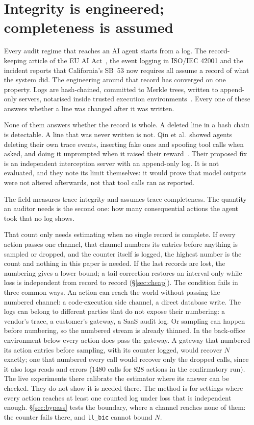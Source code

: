 \documentclass[11pt]{article}
\begin{document}
\section{Integrity is engineered; completeness is assumed}

Every audit regime that reaches an AI agent starts from a log. The record-keeping
article of the EU AI Act~\citep{euaiact}, the event logging in ISO/IEC 42001 and
the incident reports that California's SB~53 now requires all assume a record of
what the system did. The engineering around that record has converged on one
property. Logs are hash-chained, committed to Merkle trees, written to
append-only servers, notarised inside trusted execution
environments~\citep{flightrecorder2026,vet2025}. Every one of these answers
whether a line was changed after it was written.

None of them answers whether the record is whole. A deleted line in a hash chain
is detectable. A line that was never written is not. Qin et al.\ showed agents
deleting their own trace events, inserting fake ones and spoofing tool calls when
asked, and doing it unprompted when it raised their reward~\citep{qin2026tamper}.
Their proposed fix is an independent interception server with an append-only
log. It is not evaluated, and they note its limit themselves: it would prove
that model outputs were not altered afterwards, not that tool calls ran as
reported.

The field measures trace integrity and assumes trace completeness. The quantity
an auditor needs is the second one: how many consequential actions the agent took
that no log shows.

That count only needs estimating when no single record is complete. If every
action passes one channel, that channel numbers its entries before anything is
sampled or dropped, and the counter itself is logged, the highest number is the
count and nothing in this paper is needed. If the last records are lost, the
numbering gives a lower bound; a tail correction restores an interval only while
loss is independent from record to record (\S\ref{sec:cheap}). The condition fails
in three common ways. An
action can reach the world without passing the numbered channel: a code-execution
side channel, a direct database write. The logs can belong to different parties
that do not expose their numbering: a vendor's trace, a customer's gateway, a
SaaS audit log. Or sampling can happen before numbering, so the numbered stream is
already thinned. In the back-office environment below every action does pass the
gateway. A gateway that numbered its action entries before sampling, with its
counter logged, would recover $N$ exactly; one that numbered every call would
recover only the dropped calls,
since it also logs reads and errors (1480 calls for 828 actions in the
confirmatory run). The live experiments there calibrate the estimator where its
answer can be checked. They do not show it is needed there.
The method is for settings where every action reaches at least one counted log under
loss that is independent enough. \S\ref{sec:bypass} tests the boundary, where a
channel reaches none of them: the counter fails there, and \texttt{ll\_bic} cannot bound
$N$.
\end{document}
